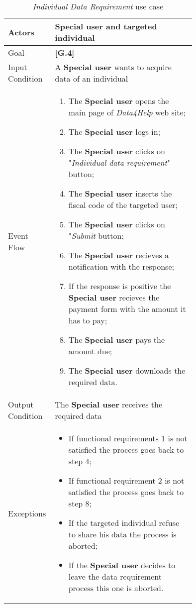 \begin{center}
\begin{table}
\begin{tabular}{ | l | p{0.75\linewidth} | }
  \hline
    Actors & \textbf{Special user} and targeted individual \\ \hline
    Goal & \textbf{[G.4]} \\ \hline
    Input Condition & A \textbf{Special user} wants to acquire data of an individual \\ \hline
    Event Flow & \begin{minipage}[t]{0.7\textwidth}
      \begin{enumerate}
        \item The \textbf{Special user} opens the main page of \textit{Data4Help} web site;
        \item The \textbf{Special user} logs in;
        \item The \textbf{Special user} clicks on "\textit{Individual data requirement}" button;
        \item The \textbf{Special user} inserts the fiscal code of the targeted user;
        \item The \textbf{Special user} clicks on "\textit{Submit} button;
        \item The \textbf{Special user} recieves a notification with the response;
        \item If the response is positive the \textbf{Special user} recieves the payment form with the amount it has to pay;
        \item The \textbf{Special user} pays the amount due;
        \item The \textbf{Special user} downloads the required data.
      \end{enumerate}
    \smallskip
  \end{minipage} \\ \hline
  Output Condition & The \textbf{Special user} receives the required data \\ \hline
  Exceptions & \begin{minipage}[t]{0.7\textwidth}
    \begin{itemize}
      \smallskip
      \item If functional requirements 1 is not satisfied the process goes back to step 4;
      \item If functional requirement 2 is not satisfied the process goes back to step 8;
      \item If the targeted individual refuse to share his data the process is aborted;
      \item If the \textbf{Special user} decides to leave the data requirement process this one is aborted.
    \end{itemize}
    \smallskip
  \end{minipage}  \\ \hline
\end{tabular}
\caption{\textit{Individual Data Requirement} use case}
\label{table:individualDataRequirement}
\end{table}
\end{center}
